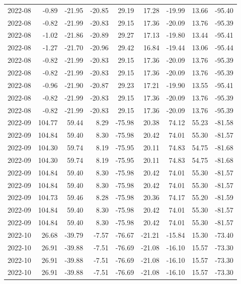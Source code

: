 \begin{table}[ht]
\begin{tabular}{lrrrrrrrr}
  2022-08 & -0.89 & -21.95 & -20.85 & 29.19 & 17.28 & -19.99 & 13.66 & -95.40 \\ 
  2022-08 & -0.82 & -21.99 & -20.83 & 29.15 & 17.36 & -20.09 & 13.76 & -95.39 \\ 
  2022-08 & -1.02 & -21.86 & -20.89 & 29.27 & 17.13 & -19.80 & 13.44 & -95.41 \\ 
  2022-08 & -1.27 & -21.70 & -20.96 & 29.42 & 16.84 & -19.44 & 13.06 & -95.44 \\ 
  2022-08 & -0.82 & -21.99 & -20.83 & 29.15 & 17.36 & -20.09 & 13.76 & -95.39 \\ 
  2022-08 & -0.82 & -21.99 & -20.83 & 29.15 & 17.36 & -20.09 & 13.76 & -95.39 \\ 
  2022-08 & -0.96 & -21.90 & -20.87 & 29.23 & 17.21 & -19.90 & 13.55 & -95.41 \\ 
  2022-08 & -0.82 & -21.99 & -20.83 & 29.15 & 17.36 & -20.09 & 13.76 & -95.39 \\ 
  2022-08 & -0.82 & -21.99 & -20.83 & 29.15 & 17.36 & -20.09 & 13.76 & -95.39 \\ 
  2022-09 & 104.77 & 59.44 & 8.29 & -75.98 & 20.38 & 74.12 & 55.23 & -81.58 \\ 
  2022-09 & 104.84 & 59.40 & 8.30 & -75.98 & 20.42 & 74.01 & 55.30 & -81.57 \\ 
  2022-09 & 104.30 & 59.74 & 8.19 & -75.95 & 20.11 & 74.83 & 54.75 & -81.68 \\ 
  2022-09 & 104.30 & 59.74 & 8.19 & -75.95 & 20.11 & 74.83 & 54.75 & -81.68 \\ 
  2022-09 & 104.84 & 59.40 & 8.30 & -75.98 & 20.42 & 74.01 & 55.30 & -81.57 \\ 
  2022-09 & 104.84 & 59.40 & 8.30 & -75.98 & 20.42 & 74.01 & 55.30 & -81.57 \\ 
  2022-09 & 104.73 & 59.46 & 8.28 & -75.98 & 20.36 & 74.17 & 55.20 & -81.59 \\ 
  2022-09 & 104.84 & 59.40 & 8.30 & -75.98 & 20.42 & 74.01 & 55.30 & -81.57 \\ 
  2022-09 & 104.84 & 59.40 & 8.30 & -75.98 & 20.42 & 74.01 & 55.30 & -81.57 \\ 
  2022-10 & 26.68 & -39.79 & -7.57 & -76.67 & -21.21 & -15.84 & 15.30 & -73.40 \\ 
  2022-10 & 26.91 & -39.88 & -7.51 & -76.69 & -21.08 & -16.10 & 15.57 & -73.30 \\ 
  2022-10 & 26.91 & -39.88 & -7.51 & -76.69 & -21.08 & -16.10 & 15.57 & -73.30 \\ 
  2022-10 & 26.91 & -39.88 & -7.51 & -76.69 & -21.08 & -16.10 & 15.57 & -73.30 \\ 

\end{tabular}
\end{table}

